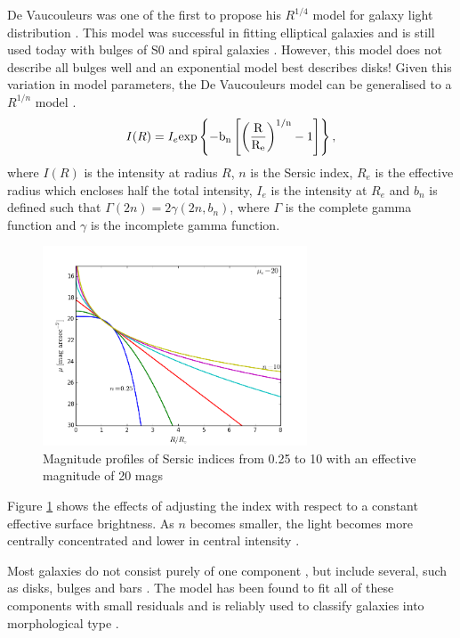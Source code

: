 De Vaucouleurs was one of the first to propose his $R^{1/4}$ model for galaxy light distribution \citep{de_vaucouleurs_revised_1963}. This model was successful in fitting elliptical galaxies and is still used today with bulges of S0 and spiral galaxies \citep{allen_millennium_2006}. However, this model does not describe all bulges well and an exponential model best describes disks! Given this variation in model parameters, the De Vaucouleurs model can be generalised to a \sersic $R^{1/n}$ model \citep{sersic_atlas_1968}.
\begin{equation}
		I(R) = I_{e} \rm{exp}\left\{-b_{n}\left[\left(\frac{R}{R_{e}}\right)^{1/n} - 1\right]\right\},
\end{equation}
where $I(R)$ is the intensity at radius $R$, $n$ is the Sersic index, $R_e$ is the effective radius which encloses half the total intensity, $I_e$ is the intensity at $R_e$ and $b_n$ is defined such that $\Gamma(2n) = 2\gamma(2n, b_n)$, where $\Gamma$ is the complete gamma function and $\gamma$ is the incomplete gamma function.

\begin{figure}[!ht]
		\centering
		\includegraphics[width=0.7\textwidth]{figs/sersic_mags.png}
		\caption{\footnotesize{Magnitude profiles of Sersic indices from 0.25 to 10 with an effective magnitude of 20 mags}}
		\label{fig:sersic_mags}
	\end{figure}
Figure \ref{fig:sersic_mags} shows the effects of adjusting the \sersic index with respect to a constant effective surface brightness. As $n$ becomes smaller, the light becomes more centrally concentrated and lower in central intensity \citep{graham_concise_2005}. 

Most galaxies do not consist purely of one component \citep{laurikainen_multicomponent_2005}, but include several, such as disks, bulges and bars \citep{rawle_s0_2013}. The \sersic model has been found to fit all of these components with small residuals and is reliably used to classify galaxies into morphological type \citep{peng_detailed_2010}.

